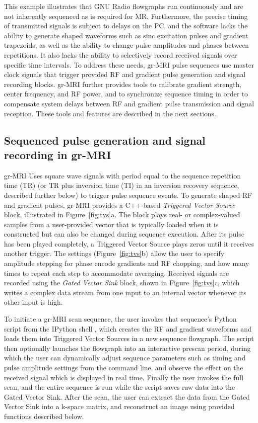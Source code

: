 \documentclass[10pt,letterpaper]{article}
\begin{document}
\par This example illustrates that GNU Radio flowgraphs run continuously and are not inherently sequenced
as is required for MR.
Furthermore, the precise timing of transmitted signals is subject to delays on the PC,
and the software lacks the ability to generate shaped waveforms such as sinc excitation pulses and gradient trapezoids,
as well as the ability to change pulse amplitudes and phases between repetitions.  
It also lacks the ability to selectively record received signals over specific time intervals. 
To address these needs, gr-MRI pulse sequences use master clock signals that trigger 
provided RF and gradient pulse generation and signal recording blocks.   
gr-MRI further provides tools to calibrate gradient strength, center frequency, and RF power,
and to synchronize sequence timing in order to compensate system
delays between RF and gradient pulse transmission and signal reception. 
These tools and features are described in the next sections.

\subsection*{Sequenced pulse generation and signal recording in gr-MRI}
gr-MRI Uses square wave signals with period equal to the sequence repetition time (TR) 
(or TR plus inversion time (TI) in an inversion recovery sequence, described further below) to trigger pulse sequence events.
To generate shaped RF and gradient pulses, 
gr-MRI provides a C++-based \textit{Triggered Vector Source} block, illustrated in Figure~\ref{fig:tvs}a. 
The block plays real- or complex-valued samples from a user-provided vector that is typically loaded when it is constructed but can also be changed during sequence execution.  
After its pulse has been played completely, 
a Triggered Vector Source plays zeros until it receives another trigger.
The settings (Figure~\ref{fig:tvs}b) allow the user to specify 
amplitude stepping for phase encode gradients and RF chopping, 
and how many times to repeat each step to accommodate averaging.
Received signals are recorded using the \textit{Gated Vector Sink} block, shown in Figure~\ref{fig:tvs}c, 
which writes a complex data stream from one input to an internal vector whenever its other input is high.  

\par To initiate a gr-MRI scan sequence, 
the user invokes that sequence's Python script from the IPython shell \cite{PER-GRA:2007}, which
creates the RF and gradient waveforms and loads
them into Triggered Vector Sources in a new sequence flowgraph.
The script then optionally launches the flowgraph into an interactive prescan period, 
during which the user can dynamically adjust sequence parameters such as timing and pulse amplitude settings from the command line,
and observe the effect on the received signal which is displayed in real time.
Finally the user invokes the full scan,
and the entire sequence is run while the script saves raw data into the Gated Vector Sink.
After the scan, the user can extract the data from the Gated Vector Sink into a k-space matrix,
and reconstruct an image using provided functions described below.
\end{document}
